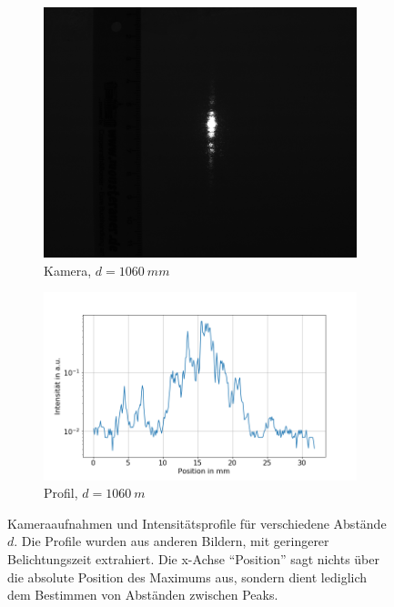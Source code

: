 \documentclass[
	a4paper,
	12pt,
	pagesize,
	ngerman
]{scrartcl}
\begin{document}
\begin{figure}[H]
\begin{subfigure}[b]{0.4\textwidth}
            \includegraphics[width=\textwidth]{raw/1/1_mittel2_bild}
            \caption[]%
            {Kamera, $d=\SI{1060}{mm}$}
            \label{fig_mittel2_bild}
        \end{subfigure}
        \quad
        \begin{subfigure}[b]{0.55\textwidth}
            \centering
            \includegraphics[width=\textwidth]{img/1/1_mittel2_plot}
            \caption[]%
            {Profil, $d=\SI{1060}{m}$}
            \label{fig_mittel2_plot}
        \end{subfigure}
        \caption%
        {
				Kameraaufnahmen und Intensitätsprofile für verschiedene Abstände $d$.
				Die Profile wurden aus anderen Bildern, mit geringerer Belichtungszeit extrahiert.
				Die x-Achse \enquote{Position} sagt nichts über die absolute Position des Maximums aus, sondern dient lediglich dem Bestimmen von Abständen zwischen Peaks.
				}
        \label{fig_1_mix_1}
    \end{figure}
\end{document}
